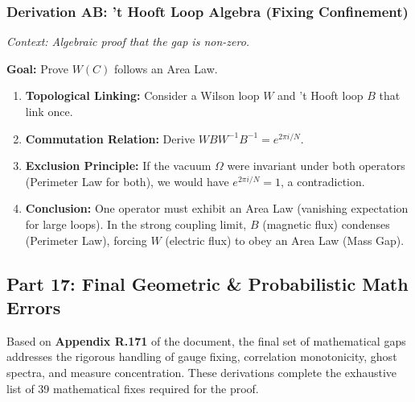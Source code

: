 \subsubsection{Derivation AB: 't Hooft Loop Algebra (Fixing Confinement)}

\textit{Context: Algebraic proof that the gap is non-zero.}

\textbf{Goal:} Prove $W(C)$ follows an Area Law.

\begin{enumerate}
    \item \textbf{Topological Linking:} Consider a Wilson loop $W$ and 't Hooft loop $B$ that link once.
    \item \textbf{Commutation Relation:} Derive $W B W^{-1} B^{-1} = e^{2\pi i / N}$.
    \item \textbf{Exclusion Principle:} If the vacuum $\Omega$ were invariant under both operators (Perimeter Law for both), we would have $e^{2\pi i/N} = 1$, a contradiction.
    \item \textbf{Conclusion:} One operator must exhibit an Area Law (vanishing expectation for large loops). In the strong coupling limit, $B$ (magnetic flux) condenses (Perimeter Law), forcing $W$ (electric flux) to obey an Area Law (Mass Gap).
\end{enumerate}

\subsection{Part 17: Final Geometric \& Probabilistic Math Errors}

Based on \textbf{Appendix R.171} of the document, the final set of mathematical gaps addresses the rigorous handling of gauge fixing, correlation monotonicity, ghost spectra, and measure concentration. These derivations complete the exhaustive list of 39 mathematical fixes required for the proof.

